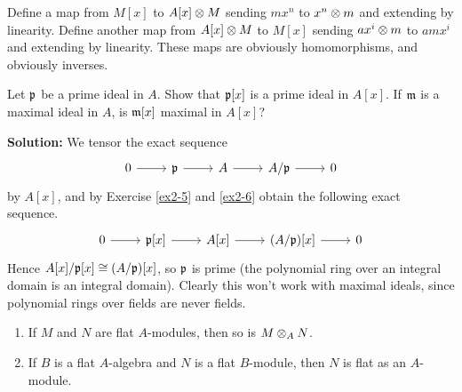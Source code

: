 \documentclass{article}
\begin{document}
Define a map from \(M[x]\) to \(A[x] \otimes M\) sending \(m x^n\) to \(x^n \otimes m\) and extending by linearity.
Define another map from \(A[x] \otimes M\) to \(M[x]\) sending \(a x^i \otimes m\) to \(a m x^i\) and extending by linearity.
These maps are obviously homomorphisms, and obviously inverses.

\begin{exercise}
    Let \(\mathfrak{p}\) be a prime ideal in \(A\).
    Show that \(\mathfrak{p}[x]\) is a prime ideal in \(A[x]\).
    If \(\mathfrak{m}\) is a maximal ideal in \(A\), is \(\mathfrak{m}[x]\) maximal in \(A[x]\)?
\end{exercise}

\noindent\textbf{Solution:}
We tensor the exact sequence
\[
    \begin{tikzcd}
        0 \arrow[r] & \idealp \arrow[r] & A \arrow[r] & A/\idealp \arrow[r] & 0
    \end{tikzcd}
\]
by \(A[x]\), and by Exercise \ref{ex2-5} and \ref{ex2-6} obtain the following exact sequence.
\[
    \begin{tikzcd}
        0 \arrow[r] & \idealp[x] \arrow[r] & A[x] \arrow[r] & (A/\idealp)[x] \arrow[r] & 0
    \end{tikzcd}
\]
Hence \(A[x]/\mathfrak{p}[x] \cong (A/\mathfrak{p})[x]\), so \(\mathfrak{p}\) is prime (the polynomial ring over an integral domain is an integral domain).
Clearly this won't work with maximal ideals, since polynomial rings over fields are never fields.

\begin{exercise}
    \begin{enumerate}
        \item
            If \(M\) and \(N\) are flat \(A\)-modules, then so is \(M \otimes_A N\).
        \item
            If \(B\) is a flat \(A\)-algebra and \(N\) is a flat \(B\)-module, then \(N\) is flat as an \(A\)-module.
    \end{enumerate}
\end{exercise}
\end{document}
